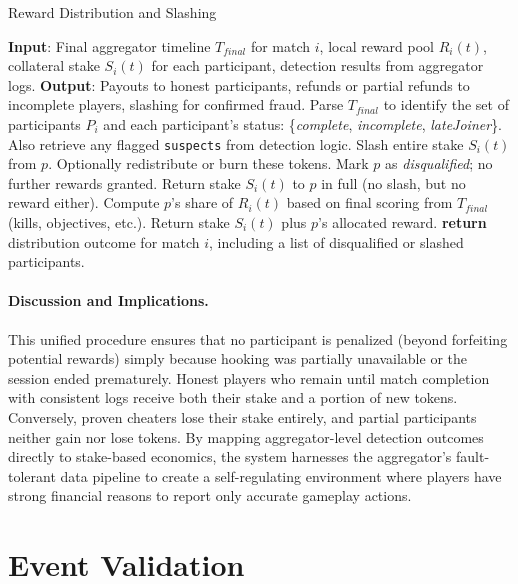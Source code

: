 \documentclass[11pt]{article}
\begin{document}
\begin{algorithm}[H]
\scriptsize
\caption{Reward Distribution and Slashing}
\label{algo:rewardAndSlash}
\begin{algorithmic}[1]
\State \textbf{Input}: Final aggregator timeline $T_{final}$ for match $i$, local reward pool $R_i(t)$, collateral stake $S_i(t)$ for each participant, detection results from aggregator logs.
\State \textbf{Output}: Payouts to honest participants, refunds or partial refunds to incomplete players, slashing for confirmed fraud.
\State Parse $T_{final}$ to identify the set of participants $P_i$ and each participant’s status: \{\emph{complete}, \emph{incomplete}, \emph{lateJoiner}\}. Also retrieve any flagged \texttt{suspects} from detection logic.
    \State Slash entire stake $S_i(t)$ from $p$. Optionally redistribute or burn these tokens.
    \State Mark $p$ as \emph{disqualified}; no further rewards granted.
    \State Return stake $S_i(t)$ to $p$ in full (no slash, but no reward either).
  \Else
    \State Compute $p$’s share of $R_i(t)$ based on final scoring from $T_{final}$ (kills, objectives, etc.).
    \State Return stake $S_i(t)$ plus $p$’s allocated reward.
  \EndIf
\EndFor
\State \textbf{return} distribution outcome for match $i$, including a list of disqualified or slashed participants.
\end{algorithmic}
\end{algorithm}


\paragraph{Discussion and Implications.}
This unified procedure ensures that no participant is penalized (beyond forfeiting potential rewards) simply because hooking was partially unavailable or the session ended prematurely. Honest players who remain until match completion with consistent logs receive both their stake and a portion of new tokens. Conversely, proven cheaters lose their stake entirely, and partial participants neither gain nor lose tokens. By mapping aggregator-level detection outcomes directly to stake-based economics, the system harnesses the aggregator’s fault-tolerant data pipeline to create a self-regulating environment where players have strong financial reasons to report only accurate gameplay actions.

\section{Event Validation}
\end{document}
